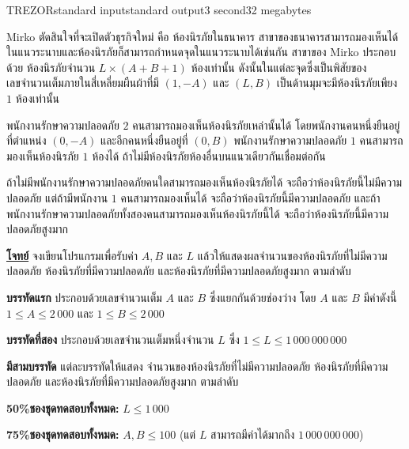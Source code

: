 \documentclass[11pt,a4paper]{article}
\begin{document}
\begin{problem}{TREZOR}{standard input}{standard output}{3 second}{32 megabytes}

Mirko ตัดสินใจที่จะเปิดตัวธุรกิจใหม่ คือ ห้องนิรภัยในธนาคาร   สาขาของธนาคารสามารถมองเห็นได้ในแนวระนาบและห้องนิรภัยก็สามารถกำหนดจุดในแนวระนาบได้เช่นกัน   สาขาของ Mirko ประกอบด้วย ห้องนิรภัยจำนวน $L\times (A+B+1)$ ห้องเท่านั้น   ดังนั้นในแต่ละจุดซึ่งเป็นพิสัยของเลขจำนวนเต็มภายในสี่เหลี่ยมผืนผ้าที่มี $(1, −A)$ และ $(L, B)$ เป็นด้านมุมจะมีห้องนิรภัยเพียง $1$ ห้องเท่านั้น

พนักงานรักษาความปลอดภัย $2$ คนสามารถมองเห็นห้องนิรภัยเหล่านั้นได้ โดยพนักงานคนหนึ่งยืนอยู่ที่ตำแหน่ง $(0, -A)$ และอีกคนหนึ่งยืนอยู่ที่ $(0, B)$   พนักงานรักษาความปลอดภัย $1$ คนสามารถมองเห็นห้องนิรภัย $1$ ห้องได้ ถ้าไม่มีห้องนิรภัยห้องอื่นบนแนวเดียวกันเชื่อมต่อกัน

ถ้าไม่มีพนักงานรักษาความปลอดภัยคนใดสามารถมองเห็นห้องนิรภัยได้ จะถือว่าห้องนิรภัยนี้ไม่มีความปลอดภัย แต่ถ้ามีพนักงาน $1$ คนสามารถมองเห็นได้ จะถือว่าห้องนิรภัยนี้มีความปลอดภัย และถ้าพนักงานรักษาความปลอดภัยทั้งสองคนสามารถมองเห็นห้องนิรภัยนี้ได้ จะถือว่าห้องนิรภัยนี้มีความปลอดภัยสูงมาก
    

\bigskip
\underline{\textbf{โจทย์}}  จงเขียนโปรแกรมเพื่อรับค่า $A, B$ และ $L$ แล้วให้แสดงผลจำนวนของห้องนิรภัยที่ไม่มีความปลอดภัย   ห้องนิรภัยที่มีความปลอดภัย   และห้องนิรภัยที่มีความปลอดภัยสูงมาก ตามลำดับ


\InputFile

\textbf{บรรทัดแรก}  ประกอบด้วยเลขจำนวนเต็ม $A$ และ $B$ ซึ่งแยกกันด้วยช่องว่าง โดย $A$ และ $B$ มีค่าดังนี้  $1 \leq A \leq 2\,000$ และ $1 \leq B \leq 2\,000$

\textbf{บรรทัดที่สอง}   ประกอบด้วยเลขจำนวนเต็มหนึ่งจำนวน $L$ ซึ่ง $1 \leq L \leq 1\,000\,000\,000$


\OutputFile

\textbf{มีสามบรรทัด} แต่ละบรรทัดให้แสดง จำนวนของห้องนิรภัยที่ไม่มีความปลอดภัย   ห้องนิรภัยที่มีความปลอดภัย   และห้องนิรภัยที่มีความปลอดภัยสูงมาก ตามลำดับ

\Examples

\begin{example}
%
%
%
\end{example}

\Scoring 

\textbf{50\%ชองชุดทดสอบทั้งหมด:} $L \leq 1\,000$

\textbf{75\%ชองชุดทดสอบทั้งหมด:} $A,B \leq 100$  (แต่ $L$ สามารถมีค่าได้มากถึง $1\,000\,000\,000$)
  
\Source


\end{problem}
\end{document}
